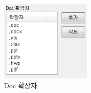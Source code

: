 \documentclass[letterpaper, 11pt]{article} %
\begin{document}
	\begin{figure}[h]
		\centering
		\includegraphics[width=0.4\textwidth]{Figures/Doc}
		\caption{Doc 확장자}
		\label{fig:Doc}
	\end{figure}
\end{document}
